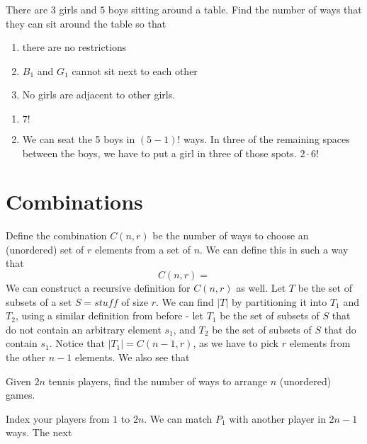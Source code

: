 \documentclass[11pt,twosided]{article}
\begin{document}
\begin{problem}{2}
There are $3$ girls and $5$ boys sitting around a table. Find the number of ways that they can sit around the table so that
\begin{enumerate}
\item there are no restrictions
\item $B_1$ and $G_1$ cannot sit next to each other 
\item No girls are adjacent to other girls.
\end{enumerate}
\end{problem}
\begin{solution}
\begin{enumerate}
\item $7!$ 
\item We can seat the 5 boys in $(5-1)!$ ways. In three of the remaining spaces between the boys, we have to put a girl in three of those spots. $2 \cdot 6!$
\end{enumerate}
\end{solution}

\section{Combinations}
Define the combination $C(n,r)$ be the number of ways to choose an (unordered) set of $r$ elements from a set of $n$. We can define this in such a way that 
\[
	C(n, r) = 
\]
We can construct a recursive definition for $C(n, r)$ as well. Let $T$ be the set of subsets of a set $S = stuff $ of size $r$. We can find $|T|$ by partitioning it into $T_1$ and $T_2$, using a similar definition from before - let $T_1$ be the set of subsets of $S$ that do not contain an arbitrary element $s_1$, and $T_2$ be the set of subsets of $S$ that do contain $s_1$. Notice that $|T_1| = C(n-1, r)$, as we have to pick $r$ elements from the other $n-1$ elements. We also see that 


\begin{problem}{3}
Given $2n$ tennis players, find the number of ways to arrange $n$ (unordered) games. 
\end{problem}

\begin{solution}{1}
Index your players from $1$ to $2n$. We can match $P_1$ with another player in $2n-1$ ways. The next 
\end{solution}
\end{document}
